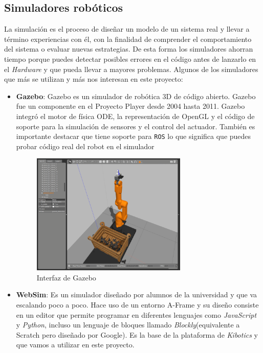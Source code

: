 \subsection{Simuladores robóticos}
\label{sec:simuladores}
La simulación  es el proceso de diseñar un modelo de un sistema real y llevar a término experiencias con él, con la finalidad de comprender el comportamiento del sistema o evaluar nuevas estrategias. De esta forma los simuladores ahorran tiempo porque puedes detectar posibles errores en el código antes de lanzarlo en el \textit{Hardware} y que pueda llevar a mayores problemas.\newline
Algunos de los simuladores que más se utilizan y más nos interesan en este proyecto:
\begin{itemize}
    \item \textbf{Gazebo}\cite{bib:gazebo}: Gazebo es un simulador de robótica 3D de código abierto. Gazebo fue un componente en el Proyecto Player desde 2004 hasta 2011. Gazebo integró el motor de física ODE, la representación de OpenGL y el código de soporte para la simulación de sensores y el control del actuador. También es importante destacar que tiene soporte para \texttt{ROS} lo que significa que puedes probar código real del robot en el simulador
    \begin{figure}[H]
    \centering
    \includegraphics[width=0.7\textwidth]{img/gazebo.png}
    \caption{Interfaz de Gazebo} \label{fig:gazebo}
    \end{figure}
    
    \item \textbf{WebSim}: Es un simulador diseñado por alumnos de la universidad y que va escalando poco a poco. Hace uso de un entorno A-Frame y su diseño consiste en un editor que permite programar en diferentes lenguajes como \textit{JavaScript} y \textit{Python}, incluso un lenguaje de bloques llamado \textit{Blockly}(equivalente a Scratch pero diseñado por Google). Es la base de la plataforma de \textit{Kibotics} y que vamos a utilizar en este proyecto.
\end{itemize}

